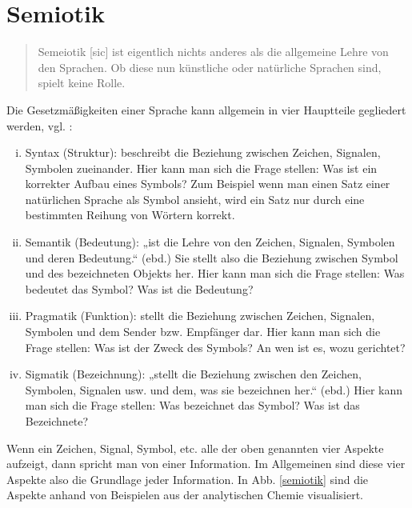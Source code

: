 \section{Semiotik}\label{semiotik-sec}
 
\begin{quote}
 Semeiotik [sic] ist eigentlich nichts anderes als die allgemeine Lehre von den Sprachen. Ob diese nun künstliche oder natürliche Sprachen sind, spielt keine Rolle. \citep[S.~8]{Malissa}
\end{quote}
 
Die Gesetzmäßigkeiten einer Sprache kann allgemein in vier Hauptteile gegliedert werden, vgl. \citep[S.~8]{Malissa}:

 
\begin{enumerate}[(i)]

\item
Syntax (Struktur): beschreibt die Beziehung zwischen Zeichen, Signalen, Symbolen zueinander. Hier kann man sich die Frage stellen: Was ist ein korrekter Aufbau eines Symbols? Zum Beispiel wenn man einen Satz einer natürlichen Sprache als Symbol ansieht, wird ein Satz nur durch eine bestimmten Reihung von Wörtern korrekt.


\item
Semantik (Bedeutung): „ist die Lehre von den Zeichen, Signalen, Symbolen und deren Bedeutung.“ (ebd.) Sie stellt also die Beziehung zwischen Symbol und des bezeichneten Objekts her. Hier kann man sich die Frage stellen: Was bedeutet das Symbol? Was ist die Bedeutung?


\item
Pragmatik (Funktion): stellt die Beziehung zwischen Zeichen, Signalen, Symbolen und dem Sender bzw. Empfänger dar. Hier kann man sich die Frage stellen: Was ist der Zweck des Symbols? An wen ist es, wozu gerichtet?


\item
Sigmatik (Bezeichnung): „stellt die Beziehung zwischen den Zeichen, Symbolen, Signalen usw. und dem, was sie bezeichnen her.“ (ebd.) Hier kann man sich die Frage stellen: Was bezeichnet das Symbol? Was ist das Bezeichnete?


\end{enumerate}
 
Wenn ein Zeichen, Signal, Symbol, etc. alle der oben genannten vier Aspekte aufzeigt, dann spricht man von einer Information. Im Allgemeinen sind diese vier Aspekte also die Grundlage jeder Information. In Abb. \ref{semiotik} sind die Aspekte anhand von Beispielen aus der analytischen Chemie visualisiert.

